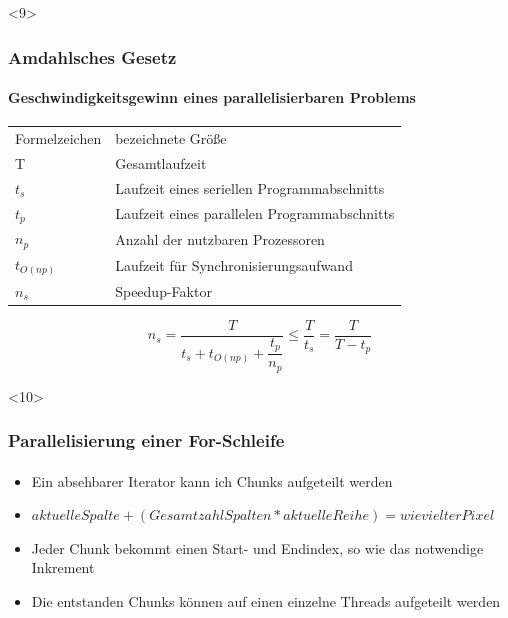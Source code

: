 \documentclass{beamer}
\begin{document}
\begin{frame}<9>
  \frametitle{Amdahlsches Gesetz}
  \framesubtitle{Geschwindigkeitsgewinn eines parallelisierbaren Problems}

  \begin{center}
    \begin{table}[]
      \begin{tabular}{ll}
        Formelzeichen & bezeichnete Größe \\
        T & Gesamtlaufzeit \\
        $t_s$ & Laufzeit eines seriellen Programmabschnitts \\
        $t_p$ & Laufzeit eines parallelen Programmabschnitts \\
        $n_p$ & Anzahl der nutzbaren Prozessoren \\
        $t_{O(np)}$ & Laufzeit für Synchronisierungsaufwand \\
        $n_s$ & Speedup-Faktor \\
      \end{tabular}
    \end{table}
  \end{center}
  
  \begin{center}
    \[ n_s = \dfrac{T}{t_s+t_{O(np)}+\dfrac{t_p}{n_p}} \leq \dfrac{T}{t_s} = \dfrac{T}{T-t_p} \]
  \end{center}
  
\end{frame}

\begin{frame}<10>
  \frametitle{Parallelisierung einer For-Schleife}
  \framesubtitle{}
  
  \begin{itemize}
    \item  Ein absehbarer Iterator kann ich Chunks aufgeteilt werden
    \item  $aktuelle Spalte+(Gesamtzahl Spalten*aktuelle Reihe) = wievielter Pixel$
    \item  Jeder Chunk bekommt einen Start- und Endindex, so wie das notwendige Inkrement 
    \item  Die entstanden Chunks können auf einen einzelne Threads aufgeteilt werden
  \end{itemize}

\end{frame}
\end{document}
